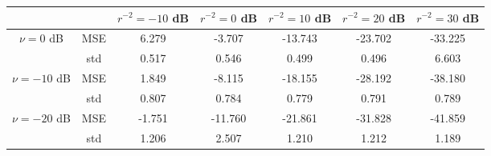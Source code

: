 \begin{tabular}{ccccccc}
\toprule
             &     &  $r^{-2}=-10$ dB &  $r^{-2}=0$ dB &  $r^{-2}=10$ dB &  $r^{-2}=20$ dB &  $r^{-2}=30$ dB \\
\midrule
$\nu=0$ dB & MSE &            6.279 &         -3.707 &         -13.743 &         -23.702 &         -33.225 \\
             & std &            0.517 &          0.546 &           0.499 &           0.496 &           6.603 \\ \hline
$\nu=-10$ dB & MSE &            1.849 &         -8.115 &         -18.155 &         -28.192 &         -38.180 \\
             & std &            0.807 &          0.784 &           0.779 &           0.791 &           0.789 \\ \hline
$\nu=-20$ dB & MSE &           -1.751 &        -11.760 &         -21.861 &         -31.828 &         -41.859 \\
             & std &            1.206 &          2.507 &           1.210 &           1.212 &           1.189 \\
\bottomrule
\end{tabular}
